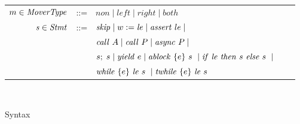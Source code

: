 \begin{figure}
\begin{tabular}{rclcl}
\end{tabular}
\begin{tabular}{rclcl}
$m \in \mathit{MoverType}$ &::= &$\mathit{non} \mid \mathit{left} \mid \mathit{right} \mid \mathit{both}$ \\
$\mathit{s} \in \mathit{Stmt}$ &::= & $\mathit{skip} \mid w := \mathit{le} \mid
\mathit{assert}\ le \mid $ \\
                  & & $\mathit{call}\ A \mid \mathit{call}\ P \mid \mathit{async}\ P \mid $\\
                  & & $s;\;s \mid \mathit{yield}\ e \mid \mathit{ablock}\ {\{e\}}\ {s}\  \mid {\mathit{if}\ {\mathit{le}}\ }{\mathit{then}\ {s}\ }{\mathit{else}\ {s}\ } \mid$ \\
                  & & ${\mathit{while}\ {\{e\}}\ \mathit{le}}\ {s}\  \mid {\mathit{twhile}\ {\{e\}}\ \mathit{le}}\ {s}\ $
                  \\ 
\end{tabular}\\
\setlength{\tabcolsep}{6pt}
\caption{Syntax}
\label{fig:syntax}
\end{figure}



